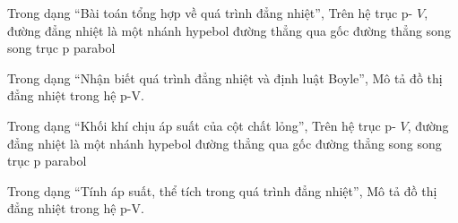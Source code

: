 \begin{ex}
Trong dạng “Bài toán tổng hợp về quá trình đẳng nhiệt”, Trên hệ trục p- $V$, đường đẳng nhiệt là
\choice
{\True một nhánh hypebol}
{đường thẳng qua gốc}
{đường thẳng song song trục p}
{parabol}
\end{ex}

\begin{ex}
Trong dạng “Nhận biết quá trình đẳng nhiệt và định luật Boyle”, Mô tả đồ thị đẳng nhiệt trong hệ p-V.
\choiceTF

\end{ex}

\begin{ex}
Trong dạng “Khối khí chịu áp suất của cột chất lỏng”, Trên hệ trục p- $V$, đường đẳng nhiệt là
\choice
{\True một nhánh hypebol}
{đường thẳng qua gốc}
{đường thẳng song song trục p}
{parabol}
\end{ex}

\begin{ex}
Trong dạng “Tính áp suất, thể tích trong quá trình đẳng nhiệt”, Mô tả đồ thị đẳng nhiệt trong hệ p-V.
\choiceTF

\end{ex}

